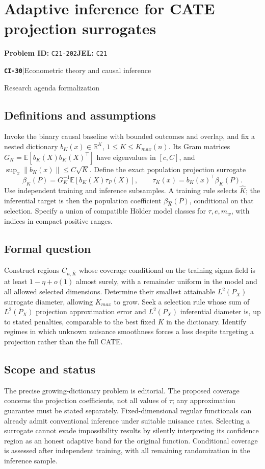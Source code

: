 \documentclass[11pt,a4paper]{article}
\newcommand{\R}{\mathbb R}
\newcommand{\E}{\mathbb E}
\newcommand{\entrymeta}[3]{{\sffamily\small\color{muted}\textbf{\texttt{#1}}\quad|\quad #2\par #3\par}}
\begin{document}
\section*{Adaptive inference for CATE projection surrogates}
\textbf{Problem ID:} \texttt{C21-202}\quad \textbf{JEL:} \texttt{C21}\par
\label{problem:OP-0509}
\label{beyond:CI-30}
\entrymeta{CI-30}{Econometric theory and causal inference}{Research agenda formalization}
\subsection*{Definitions and assumptions}
Invoke the binary causal baseline with bounded outcomes and overlap, and fix a nested dictionary $b_K(x)\in\R^K$, $1\leq K\leq K_{max}(n)$. Its Gram matrices $G_K=\E[b_K(X)b_K(X)^\top]$ have eigenvalues in $[c,C]$, and $\sup_x\|b_K(x)\|\leq C\sqrt K$. Define the exact population projection surrogate
\[
 \beta_K(P)=G_K^{-1}\E[b_K(X)\tau_P(X)],\qquad
 \tau_K(x)=b_K(x)^\top\beta_K(P).
\]
Use independent training and inference subsamples. A training rule selects $\widehat K$; the inferential target is then the population coefficient $\beta_{\widehat K}(P)$, conditional on that selection. Specify a union of compatible H\"older model classes for $\tau,e,m_w$, with indices in compact positive ranges.
\subsection*{Formal question}
Construct regions $C_{n,\widehat K}$ whose coverage conditional on the training sigma-field is at least $1-\eta+o(1)$ almost surely, with a remainder uniform in the model and all allowed selected dimensions. Determine their smallest attainable $L^2(P_X)$ surrogate diameter, allowing $K_{max}$ to grow. Seek a selection rule whose sum of $L^2(P_X)$ projection approximation error and $L^2(P_X)$ inferential diameter is, up to stated penalties, comparable to the best fixed $K$ in the dictionary. Identify regimes in which unknown nuisance smoothness forces a loss despite targeting a projection rather than the full CATE.
\subsection*{Scope and status}
The precise growing-dictionary problem is editorial. The proposed coverage concerns the projection coefficients, not all values of $\tau$; any approximation guarantee must be stated separately. Fixed-dimensional regular functionals can already admit conventional inference under suitable nuisance rates. Selecting a surrogate cannot evade impossibility results by silently interpreting its confidence region as an honest adaptive band for the original function. Conditional coverage is assessed after independent training, with all remaining randomization in the inference sample.
\end{document}
